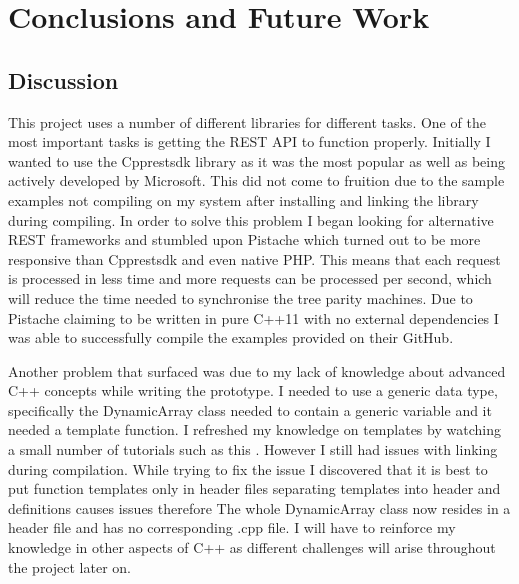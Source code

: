 \chapter{Conclusions and Future Work}
\label{chap:conclusions}

\section{Discussion}
This project uses a number of different libraries for different tasks. One of the most important tasks is getting the REST API to function properly. Initially I wanted to use the Cpprestsdk library as it was the most popular as well as being actively developed by Microsoft. This did not come to fruition due to the sample examples not compiling on my system after installing and linking the library during compiling. In order to solve this problem I began looking for alternative REST frameworks and stumbled upon Pistache which turned out to be more responsive than Cpprestsdk and even native PHP. This means that each request is processed in less time and more requests can be processed per second, which will reduce the time needed to synchronise the tree parity machines. Due to Pistache claiming to be written in pure C++11 with no external dependencies I was able to successfully compile the examples provided on their GitHub. 

Another problem that surfaced was due to my lack of knowledge about advanced C++ concepts while writing the prototype. I needed to use a generic data type, specifically the DynamicArray class needed to contain a generic variable and it needed a template function. I refreshed my knowledge on templates by watching a small number of tutorials such as this \cite{CppTotorial}. However I still had issues with linking during compilation. While trying to fix the issue I discovered \cite{cppHeaderCrap} that it is best to put function templates only in header files separating templates into header and definitions causes issues therefore The whole DynamicArray class now resides in a header file and has no corresponding .cpp file. I will have to reinforce my knowledge in other aspects of C++ as different challenges will arise throughout the project later on.

